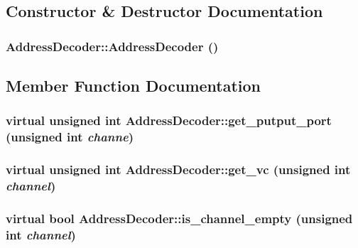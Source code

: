 \subsection{Constructor \& Destructor Documentation}
\hypertarget{classAddressDecoder_6b0422d043465fb94496c5b18670eaa9}{
\subsubsection[{AddressDecoder}]{\setlength{\rightskip}{0pt plus 5cm}AddressDecoder::AddressDecoder ()}}
\label{classAddressDecoder_6b0422d043465fb94496c5b18670eaa9}




\subsection{Member Function Documentation}
\hypertarget{classAddressDecoder_c0af5cdc36abf0ad772d3e7d7f757ad5}{
\subsubsection[{get\_\-putput\_\-port}]{\setlength{\rightskip}{0pt plus 5cm}virtual unsigned int AddressDecoder::get\_\-putput\_\-port (unsigned int {\em channe})}}
\label{classAddressDecoder_c0af5cdc36abf0ad772d3e7d7f757ad5}


\hypertarget{classAddressDecoder_aa272b780bcdf94f0e46936ba78c7419}{
\subsubsection[{get\_\-vc}]{\setlength{\rightskip}{0pt plus 5cm}virtual unsigned int AddressDecoder::get\_\-vc (unsigned int {\em channel})}}
\label{classAddressDecoder_aa272b780bcdf94f0e46936ba78c7419}


\hypertarget{classAddressDecoder_2e53d896e3d6f66deb19beae4a1f4cf7}{
\subsubsection[{is\_\-channel\_\-empty}]{\setlength{\rightskip}{0pt plus 5cm}virtual bool AddressDecoder::is\_\-channel\_\-empty (unsigned int {\em channel})}}
\label{classAddressDecoder_2e53d896e3d6f66deb19beae4a1f4cf7}


